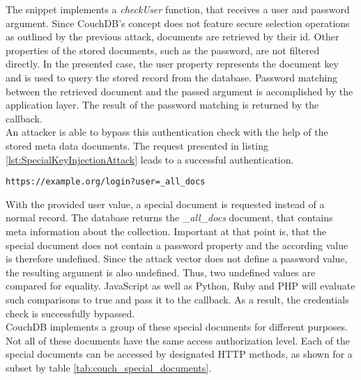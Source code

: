 The snippet implements a \emph{checkUser} function, that receives a user and password argument. Since CouchDB's concept does not feature secure selection operations as outlined by the previous attack, documents are retrieved by their id. Other properties of the stored documents, such as the password, are not filtered directly. In the presented case, the user property represents the document key and is used to query the stored record from the database. Password matching between the retrieved document and the passed argument is accomplished by the application layer. The result of the password matching is returned by the callback. \\

An attacker is able to bypass this authentication check with the help of the stored meta data documents. The request presented in listing \ref{lst:SpecialKeyInjectionAttack} leads to a successful authentication.
 
\begin{lstlisting}[caption={Attack vector on CouchDB for speical key injection via the query-string parameter}, label={lst:SpecialKeyInjectionAttack}]
https://example.org/login?user=_all_docs
\end{lstlisting}

With the provided user value, a special document is requested instead of a normal record. The database returns the \emph{\_all\_docs} document, that contains meta information about the collection. Important at that point is, that the special document does not contain a password property and the according value is therefore undefined. Since the attack vector does not define a password value, the resulting argument is also undefined. Thus, two undefined values are compared for equality. JavaScript as well as Python, Ruby and PHP will evaluate such comparisons to true and pass it to the callback. As a result, the credentials check is successfully bypassed.\\

CouchDB implements a group of these special documents for different purposes. Not all of these documents have the same access authorization level. Each of the special documents can be accessed by designated HTTP methods, as shown for a subset by table \ref{tab:couch_special_documents}. \\

